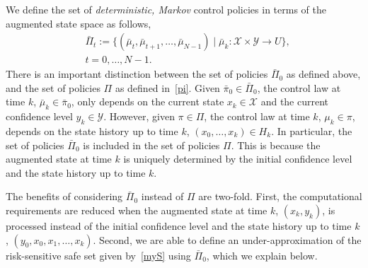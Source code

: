 \documentclass[letterpaper, 10 pt, conference]{ieeeconf}  %
\begin{document}
We define the set of \textit{deterministic, Markov} control policies in terms of the augmented state space as follows,
%
\begin{equation}
\label{augpi}
\begin{aligned}
& \bar{\Pi}_t := \{ (\bar{\mu}_t, \bar{\mu}_{t+1}, \dots, \bar{\mu}_{N-1}) \mid \bar{\mu}_k: \mathcal{X} \times \mathcal{Y} \rightarrow U \},\\
& t = 0, \dots, N-1.
\end{aligned}
\end{equation}
%
There is an important distinction between the set of policies $\bar{\Pi}_0$ as defined above,
and the set of policies $\Pi$ as defined in~\eqref{pi}.
Given $\bar{\pi}_0 \in \bar{\Pi}_0$, the control law at time $k$, $\bar{\mu}_k \in \bar{\pi}_0$, 
only depends on the current state $x_k \in \mathcal{X}$ and the current confidence level $y_k \in \mathcal{Y}$.
However, given $\pi \in \Pi$, the control law at time $k$, $\mu_k \in \pi$, 
depends on the state history up to time $k$, $(x_0, \dots, x_k) \in H_k$.
In particular, the set of policies $\bar{\Pi}_0$ is included in the set of policies $\Pi$.
This is because the augmented state at time $k$ is uniquely determined by the initial confidence level and the state history up to time $k$. 

The benefits of considering $\bar{\Pi}_0$ instead of $\Pi$ are two-fold. 
First, the computational requirements are reduced when the augmented state at time $k$, $(x_k, y_k)$, 
is processed instead of the initial confidence level and the state history up to time $k$, $(y_0, x_0, x_1, \hdots, x_k)$. 
Second, we are able to define an under-approximation
of the risk-sensitive safe set given by~\eqref{myS} using $\bar{\Pi}_0$, which we explain below.
%
\end{document}
